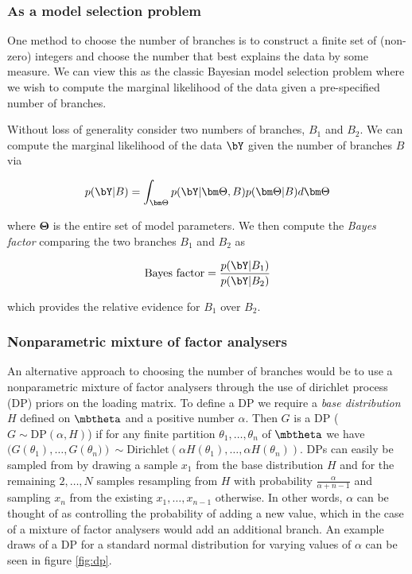 \subsubsection{As a model selection problem}

One method to choose the number of branches is to construct a finite set of (non-zero) integers and choose the number that best explains the data by some measure. We can view this as the classic Bayesian model selection problem where we wish to compute the marginal likelihood of the data given a pre-specified number of branches.

Without loss of generality consider two numbers of branches, $B_1$ and $B_2$. We can compute the marginal likelihood of the data $\bY$ given the number of branches $B$ via

\begin{equation}
	p(\bY | B) = \int_{\bm \Theta} p(\bY | \bm \Theta, B) p (\bm \Theta | B) d \bm\Theta
\end{equation}

where $\bm \Theta$ is the entire set of model parameters. We then compute the \emph{Bayes factor} comparing the two branches $B_1$ and $B_2$ as

\begin{equation}
	\text{Bayes factor} = \frac{p(\bY | B_1)}{p(\bY | B_2)}
\end{equation}

which provides the relative evidence for $B_1$ over $B_2$.

\subsubsection{Nonparametric mixture of factor analysers}

An alternative approach to choosing the number of branches would be to use a nonparametric mixture of factor analysers through the use of dirichlet process (DP) priors on the loading matrix. To define a DP we require a \emph{base distribution} $H$ defined on $\mbtheta$ and a positive number $\alpha$. Then $G$ is a DP ($G \sim \text{DP}(\alpha, H)$) if for any finite partition $\theta_1, \ldots, \theta_n$ of $\mbtheta$ we have $(G(\theta_1), \ldots, G\left(\theta_n)\right) \sim \text{Dirichlet}(\alpha H(\theta_1), \ldots, \alpha H(\theta_n))$. DPs can easily be sampled from by drawing a sample $x_1$ from the base distribution $H$ and for the remaining $2, \ldots, N$ samples resampling from $H$ with probability $\frac{\alpha}{\alpha + n - 1}$ and sampling $x_n$ from the existing $x_1, \ldots, x_{n-1}$ otherwise. In other words, $\alpha$ can be thought of as controlling the probability of adding a new value, which in the case of a mixture of factor analysers would add an additional branch. An example draws of a DP for a standard normal distribution for varying values of $\alpha$ can be seen in figure \ref{fig:dp}.

